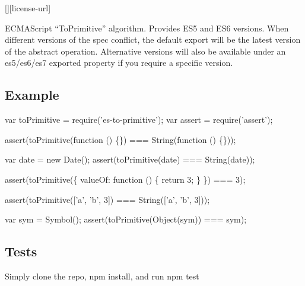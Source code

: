 \href{https://travis-ci.org/ljharb/es-to-primitive}{\tt } \href{https://david-dm.org/ljharb/es-to-primitive}{\tt } \href{https://david-dm.org/ljharb/es-to-primitive#info=devDependencies}{\tt } \mbox{[}\mbox{]}\mbox{[}license-\/url\mbox{]} \href{http://npm-stat.com/charts.html?package=es-to-primitive}{\tt }

\href{https://npmjs.org/package/es-to-primitive}{\tt }

\href{https://ci.testling.com/ljharb/es-to-primitive}{\tt }

E\+C\+M\+A\+Script “\+To\+Primitive” algorithm. Provides E\+S5 and E\+S6 versions. When different versions of the spec conflict, the default export will be the latest version of the abstract operation. Alternative versions will also be available under an {\ttfamily es5}/{\ttfamily es6}/{\ttfamily es7} exported property if you require a specific version.

\subsection*{Example}


\begin{DoxyCode}
var toPrimitive = require('es-to-primitive');
var assert = require('assert');

assert(toPrimitive(function () \{\}) === String(function () \{\}));

var date = new Date();
assert(toPrimitive(date) === String(date));

assert(toPrimitive(\{ valueOf: function () \{ return 3; \} \}) === 3);

assert(toPrimitive(['a', 'b', 3]) === String(['a', 'b', 3]));

var sym = Symbol();
assert(toPrimitive(Object(sym)) === sym);
\end{DoxyCode}


\subsection*{Tests}

Simply clone the repo, {\ttfamily npm install}, and run {\ttfamily npm test} 